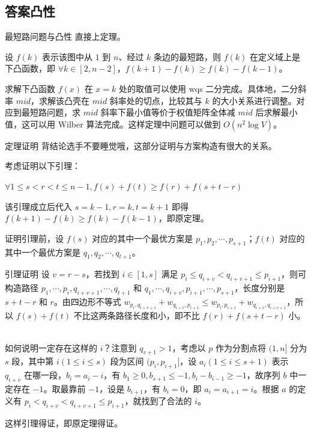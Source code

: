 \documentclass{beamer}
\begin{document}
\subsection{答案凸性}
\begin{frame}{最短路问题与凸性}
	直接上定理。
	\begin{theorem}[答案凸性]
		设 $f(k)$ 表示该图中从 $1$ 到 $n$、经过 $k$ 条边的最短路，则 $f(k)$ 在定义域上是下凸函数，即 $\forall k \in [2,n-2]$，$f(k+1)-f(k) \geq f(k)-f(k-1)$。
	\end{theorem}
	求解下凸函数 $f(x)$ 在 $x=k$ 处的取值可以使用 wqs 二分完成。具体地，二分斜率 $mid$，求解该凸壳在 $mid$ 斜率处的切点，比较其与 $k$ 的大小关系进行调整。对应到最短路问题，求 $mid$ 斜率下最小值等价于权值矩阵全体减 $mid$ 后求解最小值，这可以用 Wilber 算法完成。这样定理中问题可以做到 $O(n^2 \log V)$。
\end{frame}
\begin{frame}{定理证明}
	背结论选手不要睡觉哦，这部分证明与方案构造有很大的关系。
	
	考虑证明以下引理：
	\begin{lemma}
		$\forall 1 \leq s < r < t \leq n-1,f(s)+f(t) \geq f(r)+f(s+t-r)$
	\end{lemma}
	该引理成立后代入 $s=k-1,r=k,t=k+1$ 即得 $f(k+1)-f(k) \geq f(k)-f(k-1)$，即原定理。
	
	证明引理前，设 $f(s)$ 对应的其中一个最优方案是 $p_1,p_2,\cdots,p_{s+1}$；$f(t)$ 对应的其中一个最优方案是 $q_1,q_2,\cdots,q_{t+1}$。
\end{frame}
\begin{frame}{引理证明}
	设 $v=r-s$，若找到 $i\in[1,s]$ 满足 $p_i \leq q_{i+v} < q_{i+v+1} \leq p_{i+1}$，则可构造路径 $p_1,\cdots,p_i,q_{i+v+1},\cdots,q_{t+1}$ 和 $q_1,\cdots,q_{i+v},p_{i+1},\cdots,p_{s+1}$，长度分别是 $s+t-r$ 和 $r$。由四边形不等式 $w_{p_i,q_{i+v+1}} + w_{q_{i+v},p_{i+1}} \leq w_{p_i,p_{i+1}} + w_{q_{i+v},q_{i+v+1}}$，所以 $f(s)+f(t)$ 不比这两条路径长度和小，即不比 $f(r)+f(s+t-r)$ 小。\pause
	
	~\\
	
	如何说明一定存在这样的 $i$？注意到 $q_{v+1} > 1$，考虑以 $p$ 作为分割点将 $(1,n]$ 分为 $s$ 段，其中第 $i(1 \leq i \leq s)$ 段为区间 $(p_i,p_{i+1}]$，设 $a_i(1 \leq i \leq s+1)$ 表示 $q_{i+v}$ 在哪一段，$b_i=a_i-i$，有 $b_1 \geq 0,b_{s+1} \leq -1,b_i-b_{i-1} \geq -1$，故序列 $b$ 中一定存在 $-1$。取最靠前 $-1$，设是 $b_{i+1}$，有 $b_i=0$，即 $a_i=a_{i+1}=i$。根据 $a$ 的定义有 $p_i < q_{i+v} < q_{i+v+1} \leq p_{i+1}$，就找到了合法的 $i$。
	
	这样引理得证，即原定理得证。
\end{frame}
\end{document}
